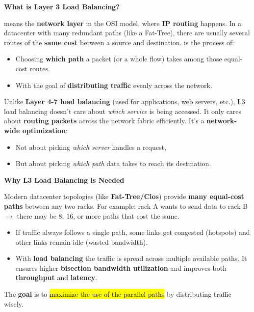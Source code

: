 \begin{flushleft}
    \textcolor{Green3}{ \textbf{What is Layer 3 Load Balancing?}}
\end{flushleft}
 means the \textbf{network layer} in the OSI model, where \textbf{IP routing} happens. In a datacenter with many redundant paths (like a Fat-Tree), there are usually several routes of the \textbf{same cost} between a source and destination.  is the process of:
\begin{itemize}
    \item[\textcolor{Green3}{\faIcon{question-circle}}] Choosing \textbf{which path} a packet (or a whole flow) takes among those equal-cost routes.
    \item[\textcolor{Green3}{\faIcon{bullseye}}] With the goal of \textbf{distributing traffic} evenly across the network.
\end{itemize}
Unlike \textbf{Layer 4-7 load balancing} (used for applications, web servers, etc.), L3 load balancing doesn't care about \emph{which service} is being accessed. It only cares about \textbf{routing packets} across the network fabric efficiently. It's a \textbf{network-wide optimization}:
\begin{itemize}
    \item Not about picking \emph{which server} handles a request,
    \item But about picking \emph{which path} data takes to reach its destination.
\end{itemize}

\highspace
\begin{flushleft}
    \textcolor{Green3}{ \textbf{Why L3 Load Balancing is Needed}}
\end{flushleft}
Modern datacenter topologies (like \textbf{Fat-Tree/Clos}) provide \textbf{many equal-cost paths} between any two racks. For example: rack A wants to send data to rack B $\rightarrow$ there may be 8, 16, or more paths that cost the same.
\begin{itemize}
    \item[\textcolor{Red2}{\faIcon{times}}] If traffic always follows a single path, some links get congested (hotspots) and other links remain idle (wasted bandwidth).
    \item[\textcolor{Green3}{\faIcon{check}}] With \textbf{load balancing} the traffic is spread across multiple available paths. It ensures higher \textbf{bisection bandwidth utilization} and improves both \textbf{throughput} and \textbf{latency}.
\end{itemize}
The \textbf{goal} is to \hl{maximize the use of the parallel paths} by distributing traffic wisely.


